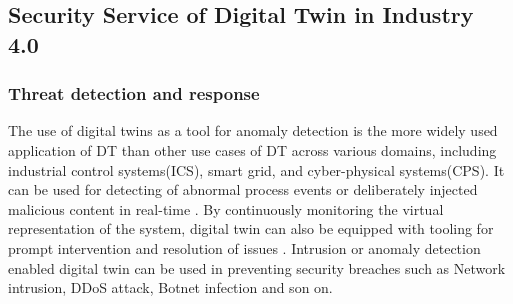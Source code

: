 
%
\subsection{Security Service of Digital Twin in Industry 4.0}

\subsubsection{Threat detection and response}
The use of digital twins as a tool for anomaly detection is the more widely used application of DT than other use cases of DT across various domains, including industrial control systems(ICS), smart grid, and cyber-physical systems(CPS). It can be used for detecting of abnormal process events \cite{xuGametheoreticApproachSecure2020} or deliberately injected malicious content \cite{saadImplementationIoTBasedDigital2020} in real-time \cite{vargheseDigitalTwinbasedIntrusion2022}. By continuously monitoring the virtual representation of the system, digital twin can also be equipped with tooling for prompt intervention and resolution of issues \cite{akbarianSecurityFrameworkDigital2021}. Intrusion or anomaly detection enabled digital twin can be used in preventing security breaches such as Network intrusion, DDoS attack, Botnet infection and son on. 


